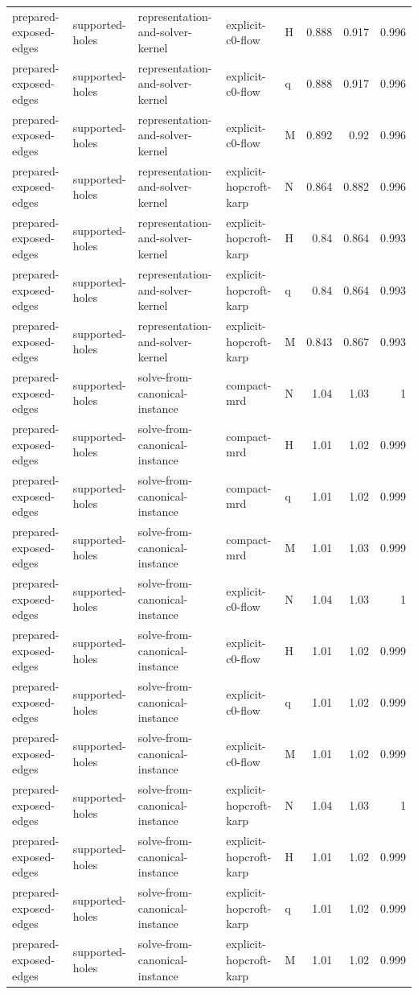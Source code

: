 \begin{table}[t]
\begin{tabular}{lllllrrr}
prepared-exposed-edges & supported-holes & representation-and-solver-kernel & explicit-c0-flow & H & 0.888 & 0.917 & 0.996 \\
prepared-exposed-edges & supported-holes & representation-and-solver-kernel & explicit-c0-flow & q & 0.888 & 0.917 & 0.996 \\
prepared-exposed-edges & supported-holes & representation-and-solver-kernel & explicit-c0-flow & M & 0.892 & 0.92 & 0.996 \\
prepared-exposed-edges & supported-holes & representation-and-solver-kernel & explicit-hopcroft-karp & N & 0.864 & 0.882 & 0.996 \\
prepared-exposed-edges & supported-holes & representation-and-solver-kernel & explicit-hopcroft-karp & H & 0.84 & 0.864 & 0.993 \\
prepared-exposed-edges & supported-holes & representation-and-solver-kernel & explicit-hopcroft-karp & q & 0.84 & 0.864 & 0.993 \\
prepared-exposed-edges & supported-holes & representation-and-solver-kernel & explicit-hopcroft-karp & M & 0.843 & 0.867 & 0.993 \\
prepared-exposed-edges & supported-holes & solve-from-canonical-instance & compact-mrd & N & 1.04 & 1.03 & 1 \\
prepared-exposed-edges & supported-holes & solve-from-canonical-instance & compact-mrd & H & 1.01 & 1.02 & 0.999 \\
prepared-exposed-edges & supported-holes & solve-from-canonical-instance & compact-mrd & q & 1.01 & 1.02 & 0.999 \\
prepared-exposed-edges & supported-holes & solve-from-canonical-instance & compact-mrd & M & 1.01 & 1.03 & 0.999 \\
prepared-exposed-edges & supported-holes & solve-from-canonical-instance & explicit-c0-flow & N & 1.04 & 1.03 & 1 \\
prepared-exposed-edges & supported-holes & solve-from-canonical-instance & explicit-c0-flow & H & 1.01 & 1.02 & 0.999 \\
prepared-exposed-edges & supported-holes & solve-from-canonical-instance & explicit-c0-flow & q & 1.01 & 1.02 & 0.999 \\
prepared-exposed-edges & supported-holes & solve-from-canonical-instance & explicit-c0-flow & M & 1.01 & 1.02 & 0.999 \\
prepared-exposed-edges & supported-holes & solve-from-canonical-instance & explicit-hopcroft-karp & N & 1.04 & 1.03 & 1 \\
prepared-exposed-edges & supported-holes & solve-from-canonical-instance & explicit-hopcroft-karp & H & 1.01 & 1.02 & 0.999 \\
prepared-exposed-edges & supported-holes & solve-from-canonical-instance & explicit-hopcroft-karp & q & 1.01 & 1.02 & 0.999 \\
prepared-exposed-edges & supported-holes & solve-from-canonical-instance & explicit-hopcroft-karp & M & 1.01 & 1.02 & 0.999 \\
\bottomrule
\end{tabular}
\end{table}

